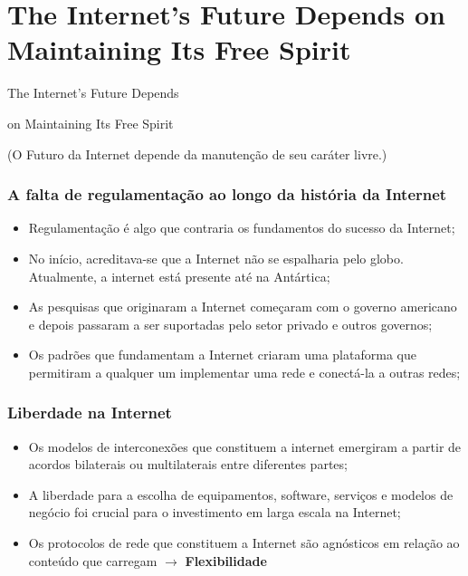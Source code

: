 \documentclass{beamer}
\begin{document}

\section{The Internet's Future Depends on Maintaining Its Free Spirit}


\begin{frame}
\huge{\centerline{The Internet's Future Depends}}
\huge{\centerline{on Maintaining Its Free Spirit}} 
\normalsize{\centerline{(O Futuro da Internet depende da manutenção de seu caráter livre.)}}
\end{frame}


\begin{frame}
\frametitle{A falta de regulamentação ao longo da história da Internet}
\begin{itemize}
\item Regulamentação é algo que contraria os fundamentos do sucesso da Internet;
\item No início, acreditava-se que a Internet não se espalharia pelo globo. Atualmente, a internet está presente até na Antártica;
\item As pesquisas que originaram a Internet começaram com o governo americano e depois passaram a ser suportadas pelo setor privado e outros governos;
\item Os padrões que fundamentam a Internet criaram uma plataforma que permitiram a qualquer um implementar uma rede e conectá-la a outras redes;
\end{itemize}
\end{frame}


\begin{frame}
\frametitle{Liberdade na Internet}
\begin{itemize}
\item Os modelos de interconexões que constituem a internet emergiram a partir de acordos bilaterais ou multilaterais entre diferentes partes;
\item A liberdade para a escolha de equipamentos, software, serviços e modelos de negócio foi crucial para o investimento em larga escala na Internet;
\item Os protocolos de rede que constituem a Internet são agnósticos em relação ao conteúdo que carregam $\rightarrow$ \textbf{Flexibilidade}
\end{itemize}
\end{frame}
\end{document}
